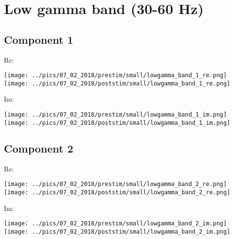 \documentclass{article}
\begin{document}
\section{Low gamma band (30-60 Hz)}
\subsection*{Component 1}
Re:


\hspace{2cm}
\texttt{[image: ../pics/07\_02\_2018/prestim/small/lowgamma\_band\_1\_re.png]}
\hspace{2cm}
\texttt{[image: ../pics/07\_02\_2018/poststim/small/lowgamma\_band\_1\_re.png]}

Im:

\hspace{2cm}
\texttt{[image: ../pics/07\_02\_2018/prestim/small/lowgamma\_band\_1\_im.png]}
\hspace{2cm}
\texttt{[image: ../pics/07\_02\_2018/poststim/small/lowgamma\_band\_1\_im.png]}

\subsection*{Component 2}
Re:

\hspace{2cm}
\texttt{[image: ../pics/07\_02\_2018/prestim/small/lowgamma\_band\_2\_re.png]}
\hspace{2cm}
\texttt{[image: ../pics/07\_02\_2018/poststim/small/lowgamma\_band\_2\_re.png]}

Im:

\hspace{2cm}
\texttt{[image: ../pics/07\_02\_2018/prestim/small/lowgamma\_band\_2\_im.png]}
\hspace{2cm}
\texttt{[image: ../pics/07\_02\_2018/poststim/small/lowgamma\_band\_2\_im.png]}

\end{document}
